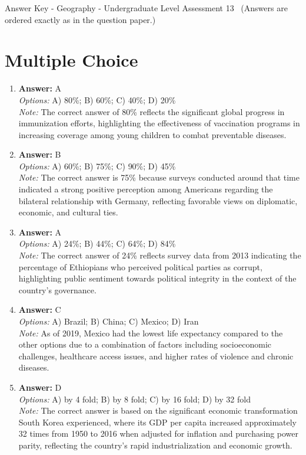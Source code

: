 \documentclass[12pt]{article}
\begin{document}
\begin{center}
Answer Key - Geography - Undergraduate Level Assessment 13 \
\small (Answers are ordered exactly as in the question paper.)
\end{center}

\section*{Multiple Choice}
\begin{enumerate}[label=\arabic*.]
\item \textbf{Answer:} A
\\ \textit{Options:} A) 80\%; B) 60\%; C) 40\%; D) 20\%
\\ \textit{Note:} The correct answer of 80\% reflects the significant global progress in immunization efforts, highlighting the effectiveness of vaccination programs in increasing coverage among young children to combat preventable diseases.
\item \textbf{Answer:} B
\\ \textit{Options:} A) 60\%; B) 75\%; C) 90\%; D) 45\%
\\ \textit{Note:} The correct answer is 75\% because surveys conducted around that time indicated a strong positive perception among Americans regarding the bilateral relationship with Germany, reflecting favorable views on diplomatic, economic, and cultural ties.
\item \textbf{Answer:} A
\\ \textit{Options:} A) 24\%; B) 44\%; C) 64\%; D) 84\%
\\ \textit{Note:} The correct answer of 24\% reflects survey data from 2013 indicating the percentage of Ethiopians who perceived political parties as corrupt, highlighting public sentiment towards political integrity in the context of the country's governance.
\item \textbf{Answer:} C
\\ \textit{Options:} A) Brazil; B) China; C) Mexico; D) Iran
\\ \textit{Note:} As of 2019, Mexico had the lowest life expectancy compared to the other options due to a combination of factors including socioeconomic challenges, healthcare access issues, and higher rates of violence and chronic diseases.
\item \textbf{Answer:} D
\\ \textit{Options:} A) by 4 fold; B) by 8 fold; C) by 16 fold; D) by 32 fold
\\ \textit{Note:} The correct answer is based on the significant economic transformation South Korea experienced, where its GDP per capita increased approximately 32 times from 1950 to 2016 when adjusted for inflation and purchasing power parity, reflecting the country's rapid industrialization and economic growth.
\end{enumerate}
\end{document}
